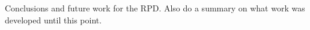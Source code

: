 Conclusions and future work for the RPD. Also do a summary on what work was developed until this point.
